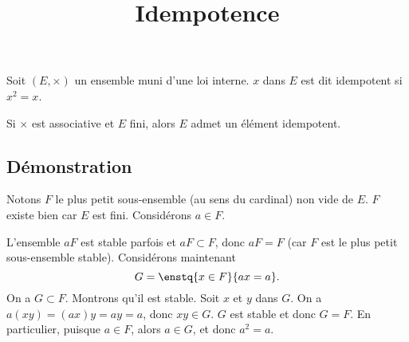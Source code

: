 \documentclass[fontsize=12pt,twoside=false,parskip=half]{scrartcl}
\title{Idempotence}
\date{}
\author{}
\begin{document}
\maketitle
   Soit $(E, \times)$ un ensemble muni d’une loi interne. $x$ dans $E$ est dit idempotent 
   si $x^2 = x$.
   \begin{Theoreme}
      Si $\times$ est associative et $E$ fini, alors $E$ admet un élément idempotent.
   \end{Theoreme}
   \subsection{Démonstration}
      Notons $F$ le plus petit sous-ensemble (au sens du cardinal) non vide de $E$. $F$ existe bien 
      car $E$ est fini. Considérons $a \in F$.
      
      L’ensemble $aF$ est stable parfois et $aF \subset F$, donc $aF = F$ (car $F$ est le plus petit
      sous-ensemble stable). Considérons maintenant
      \[
         G = \enstq{x \in F}{ax = a}.
      \]
      On a $G \subset F$. Montrons qu’il est stable. Soit $x$ et $y$ dans $G$. On a $a(xy) = (ax)y = ay = a$,
      donc $xy \in G$. $G$ est stable et donc $G = F$. En particulier, puisque $a \in F$, alors $a \in G$,
      et donc $a^2 = a$.
\end{document}
